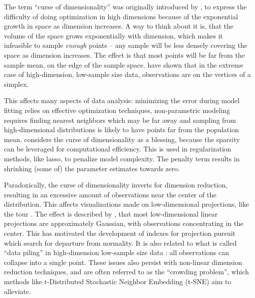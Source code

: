 \documentclass[]{interact}
\theoremstyle{plain}%
\theoremstyle{definition}
\theoremstyle{remark}
\begin{document}
The term ``curse of dimensionality'' was originally introduced by
\citet{BellmanRichard1961}, to express the difficulty of doing
optimization in high dimensions because of the exponential growth in
space as dimension increases. A way to think about it is, that the
volume of the space grows exponentially with dimension, which makes it
infeasible to sample \emph{enough} points -- any sample will be less
densely covering the space as dimension increases. The effect is that
most points will be far from the sample mean, on the edge of the sample
space. \citet{doi:10.1111/j.1467-9868.2005.00510.x} have shown that in
the extreme case of high-dimension, low-sample size data, observations
are on the vertices of a simplex.

This affects many aspects of data analysis: minimizing the error during
model fitting relies on effective optimization techniques,
non-parametric modeling requires finding nearest neighbors which may be
far away and sampling from high-dimensional distributions is likely to
have points far from the population mean. \citet{Donoho00} considers the
curse of dimensionality as a blessing, because the sparsity can be
leveraged for computational efficiency. This is used in regularization
methods, like lasso, to penalize model complexity. The penalty term
results in shrinking (some of) the parameter estimates towards zero.

Paradoxically, the curse of dimensionality inverts for dimension
reduction, resulting in an excessive amount of observations near the
center of the distribution. This affects visualizations made on
low-dimensional projections, like the tour \citep[\citet{BCAH05}]{As85}.
The effect is described by \citet{diaconis1984}, that most
low-dimensional linear projections are approximately Gaussian, with
observations concentrating in the center. This has motivated the
development of indexes for projection pursuit which search for departure
from normality. It is also related to what is called ``data piling'' in
high-dimension low-sample size data
\citep[\citet{10.1093/biomet/asp084}]{10.2307/27639976}: all
observations can collapse into a single point. These issues also persist
with non-linear dimension reduction techniques, and are often referred
to as the ``crowding problem'', which methods like t-Distributed
Stochastic Neighbor Embedding (t-SNE) \citep{tsne} aim to alleviate.
\end{document}
